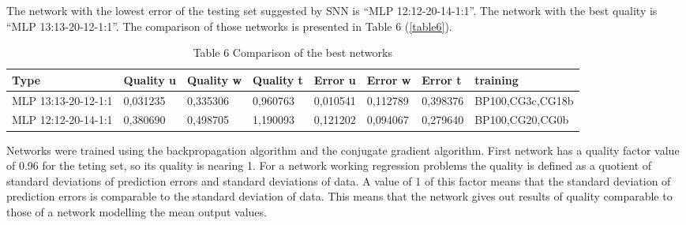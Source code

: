 \documentclass[10pt,oneside]{memoir}
\begin{document}
The network with the lowest error of the testing set suggested by SNN is ``MLP 12:12-20-14-1:1''. The network with the best quality is ``MLP 13:13-20-12-1:1''. The comparison of those networks is presented in Table 6 (\autoref{table6}).


\begin{table}[htbp]
\begin{minipage}{\linewidth}
\setlength{\tymax}{0.5\linewidth}
\centering
\small
\caption{Table 6 Comparison of the best networks}
\label{table6}
\begin{tabulary}{\linewidth}{@{}l@{}l@{}l@{}l@{}l@{}l@{}l@{}l@{}} \\ \toprule 
Type&Quality u&Quality w&Quality t&Error u&Error w&Error t&training \\\midrule
MLP 13:13-20-12-1:1&0,031235&0,335306&0,960763&0,010541&0,112789&0,398376&BP100,CG3c,CG18b \\
MLP 12:12-20-14-1:1&0,380690&0,498705&1,190093&0,121202&0,094067&0,279640&BP100,CG20,CG0b \\

		\bottomrule
	\end{tabulary}
\end{minipage}
\end{table}

Networks were trained using the backpropagation algorithm and the conjugate gradient algorithm. First network has a quality factor value of 0.96 for the teting set, so its quality is nearing 1. For a network working regression problems the quality is defined as a quotient of standard deviations of prediction errors and standard deviations of data. A value of 1 of this factor means that the standard deviation of prediction errors is comparable to the standard deviation of data. This means that the network gives out results of quality comparable to those of a network modelling the mean output values.
\end{document}
